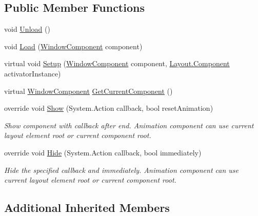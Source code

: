 \subsection*{Public Member Functions}
\begin{DoxyCompactItemize}
\item 
void \hyperlink{class_unity_engine_1_1_u_i_1_1_windows_1_1_window_layout_base_aadc5efa6845166d66beff59118e4d49d}{Unload} ()
\item 
void \hyperlink{class_unity_engine_1_1_u_i_1_1_windows_1_1_window_layout_base_aac50cd6a58463638209fc5178ca54456}{Load} (\hyperlink{class_unity_engine_1_1_u_i_1_1_windows_1_1_window_component}{Window\+Component} component)
\item 
virtual void \hyperlink{class_unity_engine_1_1_u_i_1_1_windows_1_1_window_layout_base_a4c01a982c826a8e3dee32e65b3121aa4}{Setup} (\hyperlink{class_unity_engine_1_1_u_i_1_1_windows_1_1_window_component}{Window\+Component} component, \hyperlink{class_unity_engine_1_1_u_i_1_1_windows_1_1_types_1_1_layout_1_1_component}{Layout.\+Component} activator\+Instance)
\item 
virtual \hyperlink{class_unity_engine_1_1_u_i_1_1_windows_1_1_window_component}{Window\+Component} \hyperlink{class_unity_engine_1_1_u_i_1_1_windows_1_1_window_layout_base_a3e4f293549409f043858042ab293ec99}{Get\+Current\+Component} ()
\item 
override void \hyperlink{class_unity_engine_1_1_u_i_1_1_windows_1_1_window_layout_base_abe9d6b720b99d3f1d02fb17ce2aeb542}{Show} (System.\+Action callback, bool reset\+Animation)
\begin{DoxyCompactList}\small\item\em Show component with callback after end. Animation component can use current layout element root or current component root. \end{DoxyCompactList}\item 
override void \hyperlink{class_unity_engine_1_1_u_i_1_1_windows_1_1_window_layout_base_a4e14cf8e056e4a25dc40771c7f93540e}{Hide} (System.\+Action callback, bool immediately)
\begin{DoxyCompactList}\small\item\em Hide the specified callback and immediately. Animation component can use current layout element root or current component root. \end{DoxyCompactList}\end{DoxyCompactItemize}
\subsection*{Additional Inherited Members}


